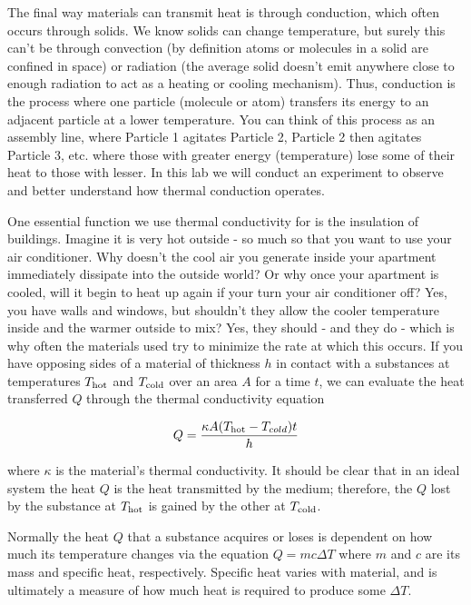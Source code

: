 The final way materials can transmit heat is through conduction, which often occurs through solids.  We know solids can change temperature, but surely this can't be through convection (by definition atoms or molecules in a solid are confined in space) or radiation (the average solid doesn't emit anywhere close to enough radiation to act as a heating or cooling mechanism).  Thus, conduction is the process where one particle (molecule or atom) transfers its energy to an adjacent particle at a lower temperature.  You can think of this process as an assembly line, where Particle 1 agitates Particle 2, Particle 2 then agitates Particle 3, etc. where those with greater energy (temperature) lose some of their heat to those with lesser.  In this lab we will conduct an experiment to observe and better understand how thermal conduction operates.\myskip

One essential function we use thermal conductivity for is the insulation of buildings.  Imagine it is very hot outside - so much so that you want to use your air conditioner.  Why doesn't the cool air you generate inside your apartment immediately dissipate into the outside world?  Or why once your apartment is cooled, will it begin to heat up again if your turn your air conditioner off?  Yes, you have walls and windows, but shouldn't they allow the cooler temperature inside and the warmer outside to mix?  Yes, they should - and they do - which is why often the materials used try to minimize the rate at which this occurs.  If you have opposing sides of a material of thickness $h$ in contact with a substances at temperatures $T_{\rm hot}$ and $T_{\rm cold}$ over an area $A$ for a time $t$, we can evaluate the heat transferred $Q$ through the thermal conductivity equation

\begin{equation}
\label{eq:thermcond}
Q=\frac{\kappa A(T_{\rm hot} - T_{cold})t}{h}
\end{equation}

\noindent where $\kappa$ is the material's thermal conductivity.  It should be clear that in an ideal system the heat $Q$ is the heat transmitted by the medium; therefore, the $Q$ lost by the substance at $T_{\rm hot}$ is gained by the other at $T_{\rm cold}$.\myskip

Normally the heat $Q$ that a substance acquires or loses is dependent on how much its temperature changes via the equation $Q=mc\Delta T$ where $m$ and $c$ are its mass and specific heat, respectively.  Specific heat varies with material, and is ultimately a measure of how much heat is required to produce some $\Delta T$.\myskip

